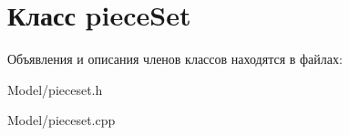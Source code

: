 \hypertarget{classpiece_set}{}\section{Класс piece\+Set}
\label{classpiece_set}


Объявления и описания членов классов находятся в файлах\+:\begin{DoxyCompactItemize}
\item 
Model/pieceset.\+h\item 
Model/pieceset.\+cpp\end{DoxyCompactItemize}
